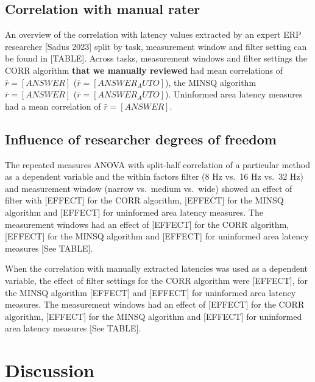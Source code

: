 \documentclass[
  man,floatsintext]{apa7}
\begin{document}
\hypertarget{correlation-with-manual-rater}{%
\subsection{Correlation with manual rater}\label{correlation-with-manual-rater}}

An overview of the correlation with latency values extracted by an expert ERP researcher {[}Sadus 2023{]} split by task, measurement window and filter setting can be found in {[}TABLE{]}. Across tasks, measurement windows and filter settings the CORR algorithm \textbf{that we manually reviewed} had mean correlations of \(\bar{r} = [ANSWER]\) (\(\bar{r} = [ANSWER_AUTO]\)), the MINSQ algorithm \(\bar{r} = [ANSWER]\) (\(\bar{r} = [ANSWER_AUTO]\)). Uninformed area latency measures had a mean correlation of \(\bar{r} = [ANSWER]\).

\hypertarget{influence-of-researcher-degrees-of-freedom}{%
\subsection{Influence of researcher degrees of freedom}\label{influence-of-researcher-degrees-of-freedom}}

The repeated measures ANOVA with split-half correlation of a particular method as a dependent variable and the within factors filter (8 Hz vs.~16 Hz vs.~32 Hz) and measurement window (narrow vs.~medium vs.~wide) showed an effect of filter with {[}EFFECT{]} for the CORR algorithm, {[}EFFECT{]} for the MINSQ algorithm and {[}EFFECT{]} for uninformed area latency measures. The measurement windows had an effect of {[}EFFECT{]} for the CORR algorithm, {[}EFFECT{]} for the MINSQ algorithm and {[}EFFECT{]} for uninformed area latency measures {[}See TABLE{]}.

When the correlation with manually extracted latencies was used as a dependent variable, the effect of filter settings for the CORR algorithm were {[}EFFECT{]}, for the MINSQ algorithm {[}EFFECT{]} and {[}EFFECT{]} for uninformed area latency measures. The measurement windows had an effect of {[}EFFECT{]} for the CORR algorithm, {[}EFFECT{]} for the MINSQ algorithm and {[}EFFECT{]} for uninformed area latency measures {[}See TABLE{]}.

\hypertarget{discussion}{%
\section{Discussion}\label{discussion}}
\end{document}
